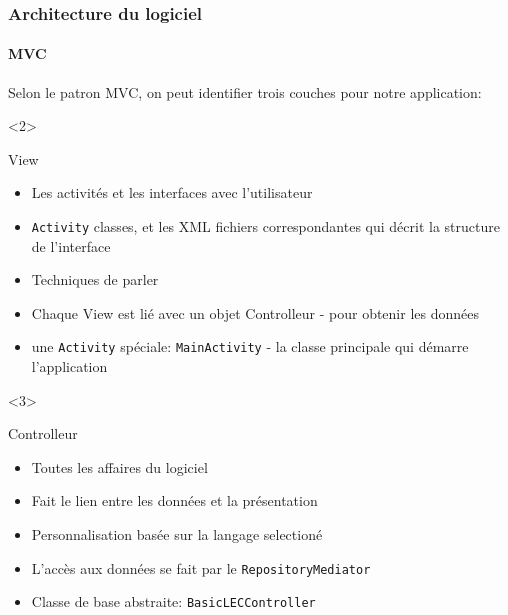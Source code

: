 \documentclass[15pt]{beamer}
\begin{document}
\begin{frame}
 \frametitle{Architecture du logiciel}
  \framesubtitle{MVC}
\begin{center}
 \item Selon le patron MVC, on peut identifier trois couches pour notre application:
\end{center}

\begin{overlayarea}{\textwidth}{8cm}
  \begin{onlyenv}<2>
    \begin{exampleblock}{View}
      \begin{itemize}
       \item Les activit\'es et les interfaces avec l'utilisateur
       \item \texttt{Activity} classes, et les XML fichiers correspondantes qui d\'ecrit la structure de l'interface
       \item Techniques de parler
       \item Chaque View est li\'e avec un objet Controlleur - pour obtenir les donn\'ees
       \item une \texttt{Activity} sp\'eciale: \texttt{MainActivity} - la classe principale qui d\'emarre l'application
      \end{itemize}
    \end{exampleblock}
  \end{onlyenv}

  \begin{onlyenv}<3>
    \begin{exampleblock}{Controlleur}
      \begin{itemize}
       \item Toutes les affaires du logiciel
       \item Fait le lien entre les donn\'ees et la pr\'esentation
       \item Personnalisation basée sur la langage selection\'e
       \item L'acc\`es aux donn\'ees se fait par le \texttt{RepositoryMediator}
       \item Classe de base abstraite: \texttt{BasicLECController}
      \end{itemize}
    \end{exampleblock}
  \end{onlyenv}


\end{overlayarea}
\end{frame}
\end{document}
